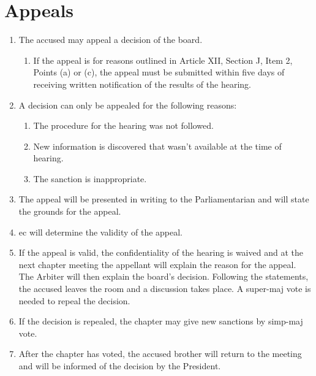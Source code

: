 \section{Appeals}
	\begin{enumerate}
		\item The accused may appeal a decision of the board.
        \begin{enumerate}
            \item If the appeal is for reasons outlined in Article XII, Section J, Item 2, Points (a) or (c), the appeal must be submitted within five days of receiving written notification of the results of the hearing.
        \end{enumerate}
		\item A decision can only be appealed for the following reasons:
			\begin{enumerate}
				\item The procedure for the hearing was not followed.
				\item New information is discovered that wasn't available at the time of hearing.
				\item The sanction is inappropriate.
			\end{enumerate}
		\item The appeal will be presented in writing to the Parliamentarian and will state the grounds for the appeal.
		\item \gls{ec} will determine the validity of the appeal.
		\item If the appeal is valid, the confidentiality of the hearing is waived and at the next chapter meeting the appellant will explain the reason for the appeal. The Arbiter will then explain the board's decision. Following the statements, the accused leaves the room and a discussion takes place. A \gls{super-maj} vote is needed to repeal the decision.
		\item If the decision is repealed, the chapter may give new sanctions by \gls{simp-maj} vote.
		\item After the chapter has voted, the accused brother will return to the meeting and will be informed of the decision by the President.
	\end{enumerate}

